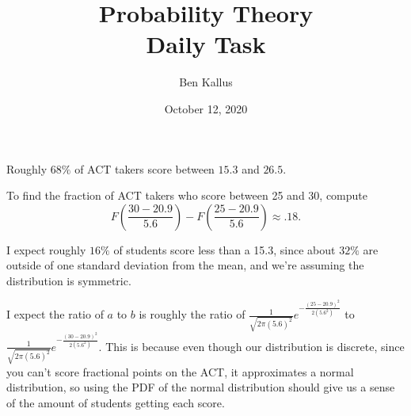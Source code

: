 \documentclass[12pt]{article}
\title{Probability Theory \\ Daily Task}
\author{Ben Kallus}
\date{October 12, 2020}
\begin{document}
\maketitle

 Roughly $68\%$ of ACT takers score between $15.3$ and $26.5$.

 To find the fraction of ACT takers who score between 25 and 30, compute $$F\left(\frac{30 - 20.9}{5.6}\right) - F\left(\frac{25 - 20.9}{5.6}\right) \approx .18.$$

 I expect roughly $16\%$ of students score less than a 15.3, since about $32\%$ are outside of one standard deviation from the mean, and we're assuming the distribution is symmetric.

 I expect the ratio of $a$ to $b$ is roughly the ratio of $\frac1{\sqrt{2\pi(5.6)^2}} e^{-\frac{(25-20.9)^2}{2(5.6^2)}}$ to $\frac1{\sqrt{2\pi(5.6)^2}} e^{-\frac{(30-20.9)^2}{2(5.6^2)}}$. This is because even though our distribution is discrete, since you can't score fractional points on the ACT, it approximates a normal distribution, so using the PDF of the normal distribution should give us a sense of the amount of students getting each score.
\end{document}
